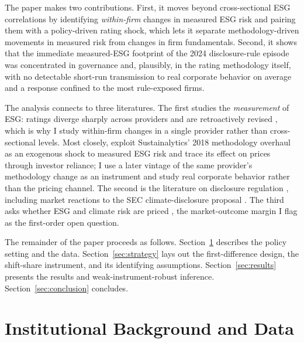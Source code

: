 \documentclass[12pt]{article}
\begin{document}
The paper makes two contributions. First, it moves beyond cross-sectional ESG correlations by
identifying \emph{within-firm} changes in measured ESG risk and pairing them with a policy-driven
rating shock, which lets it separate methodology-driven movements in measured risk from changes in
firm fundamentals. Second, it shows that the immediate measured-ESG footprint of the 2024
disclosure-rule episode was concentrated in governance and, plausibly, in the rating methodology
itself, with no detectable short-run transmission to real corporate behavior on average and a
response confined to the most rule-exposed firms.

The analysis connects to three literatures. The first studies the \emph{measurement} of ESG: ratings
diverge sharply across providers \citep{BergKolbelRigobon2022_aggregate_confusion} and are
retroactively revised \citep{BergFabisikSautner2021_rewriting_history}, which is why I study
within-firm changes in a single provider rather than cross-sectional levels. Most closely,
\citet{RzeznikWeissHanleyPelizzon2026_investor_reliance} exploit Sustainalytics' 2018 methodology
overhaul as an exogenous shock to measured ESG risk and trace its effect on prices through investor
reliance; I use a later vintage of the same provider's methodology change as an instrument and study
real corporate behavior rather than the pricing channel. The second is the literature on
disclosure regulation \citep{ChristensenHailLeuz2021_mandatory_csr}, including market reactions to
the SEC climate-disclosure proposal \citep{Kim2024_sec_climate_reaction}. The third asks whether
ESG and climate risk are priced \citep{KruegerSautnerStarks2020_climate_institutional,
BoltonKacperczyk2021_carbon_risk, PastorStambaughTaylor2021_sustainable_equilibrium}, the
market-outcome margin I flag as the first-order open question.

The remainder of the paper proceeds as follows. Section~\ref{sec:data} describes the policy
setting and the data. Section~\ref{sec:strategy} lays out the first-difference design, the
shift-share instrument, and its identifying assumptions. Section~\ref{sec:results} presents the
results and weak-instrument-robust inference. Section~\ref{sec:conclusion} concludes.

\section{Institutional Background and Data}\label{sec:data}
\end{document}
